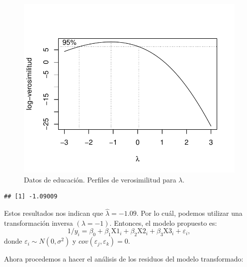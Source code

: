 \documentclass[
]{article}
\newenvironment{Shaded}{\begin{snugshade}}{\end{snugshade}}
\newcommand{\CommentTok}[1]{\textcolor[rgb]{0.56,0.35,0.01}{\textit{#1}}}
\newcommand{\FunctionTok}[1]{\textcolor[rgb]{0.00,0.00,0.00}{#1}}
\newcommand{\NormalTok}[1]{#1}
\newcommand{\SpecialCharTok}[1]{\textcolor[rgb]{0.00,0.00,0.00}{#1}}
\begin{document}
\begin{figure}

{\centering \includegraphics{MLGI_files/figure-latex/educLambda-1} 

}

\caption{\label{fig:EducBC} Datos de educación. Perfiles de verosimilitud para $\lambda$.}\label{fig:educLambda}
\end{figure}

\begin{Shaded}
\end{Shaded}

\begin{verbatim}
## [1] -1.09009
\end{verbatim}

Estos resultados nos indican que \(\widehat{\lambda}= -1.09\). Por lo cuál, podemos utilizar una transformación inversa \((\lambda=-1)\). Entonces, el modelo propuesto es:
\[
1/y_{i} = \beta_{0} + \beta_{1}\mbox{X1}_{i}+ \beta_{2}\mbox{X2}_{i} + \beta_{3}\mbox{X3}_{i} + \varepsilon_{i},
\]
donde \(\varepsilon_{i}\sim N(0,\sigma^{2})\) y \(cov(\varepsilon_{j},\varepsilon_{k})=0\).

Ahora procedemos a hacer el análisis de los residuos del modelo transformado:
\end{document}
